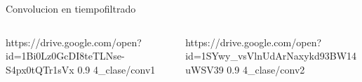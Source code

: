 \begin{frame}{Convolucion en tiempo}{filtrado}
   \begin{columns}[c]
      \begin{column}{.5\textwidth}
         {https://drive.google.com/open?id=1Bi0Lz0GcDI8teTLNse-S4px0tQTr1sVx}
         {0.9}
         {4_clase/conv1}
      \end{column}
      \hspace{2pt}
      \vrule
      \hspace{2pt}
      \begin{column}{.5\textwidth}
                {https://drive.google.com/open?id=1SYwy_vsVlnUdArNaxykd93BW14uWSV39}
                {0.9}
                {4_clase/conv2}
      \end{column}
      \hspace{2pt}
   \end{columns}
   \vfill
\end{frame}
